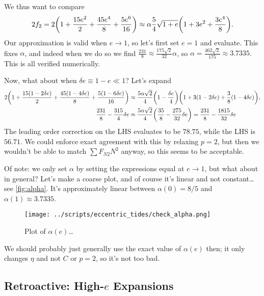 \documentclass[11pt,
        usenames, %
        dvipsnames %
    ]{article}
\DeclarePairedDelimiter\p{\lparen}{\rparen}
\begin{document}
We thus want to compare
\begin{equation}
    2f_2 = 2\p*{1 + \frac{15 e^2}{2} + \frac{45e^4}{8} + \frac{5e^6}{16}}
        \approx \alpha\frac{5}{4}\sqrt{1 + e}
            \p*{1 + 3e^2 + \frac{3e^4}{8}}.
\end{equation}
Our approximation is valid when $e \to 1$, so let's first set $e = 1$ and
evaluate. This fixes $\alpha$, and indeed when we do so we find $\frac{231}{8}
\approx \frac{175\sqrt{2}}{32}\alpha$, so $\alpha = \frac{462\sqrt{2}}{175}
\approx 3.7335$. This is all verified numerically.

Now, what about when $\delta e \equiv 1 - e \ll 1$? Let's expand
\begin{align}
    2 \p*{1
            + \frac{15\p*{1 - 2\delta e}}{2}
            + \frac{45\p*{1 - 4\delta e}}{8}
            + \frac{5\p*{1 - 6\delta e}}{16}}
        &\approx
            \frac{5\alpha \sqrt{2}}{4} \p*{1 - \frac{\delta e}{4}} \p*{
                    1 + 3\p*{1 - 2\delta e} + \frac{3}{8}
                        \p*{1 - 4\delta e}
                },\\
    \frac{231}{8} - \frac{315}{4}\delta e
        &\approx \frac{5\alpha\sqrt{2}}{4}\p*{
            \frac{35}{8} - \frac{275}{32} \delta e}
            = \frac{231}{8} - \frac{1815}{32}\delta e
\end{align}
The leading order correction on the LHS evaluates to be $78.75$, while the LHS
is $56.71$. We could enforce exact agreement with this by relaxing $p = 2$, but
then we wouldn't be able to match $\sum\limits F_{N2}N^2$ anyway, so this seems
to be acceptable.

Of note: we only set $\alpha$ by setting the expressions equal at $e \to 1$, but
what about in general? Let's make a coarse plot, and of course it's linear and
not constant\dots see \autoref{fig:alpha}. It's approximately linear between
$\alpha(0) = 8/5$ and $\alpha(1) \approx 3.7335$.
\begin{figure}[h]
    \centering
    \texttt{[image: ../scripts/eccentric\_tides/check\_alpha.png]}
    \caption{Plot of $\alpha(e)$\dots}\label{fig:alpha}
\end{figure}
We should probably just generally use the exact value of $\alpha(e)$ then; it
only changes $\eta$ and not $C$ or $p = 2$, so it's not too bad.

\subsection{Retroactive: High-$e$ Expansions}
\end{document}
